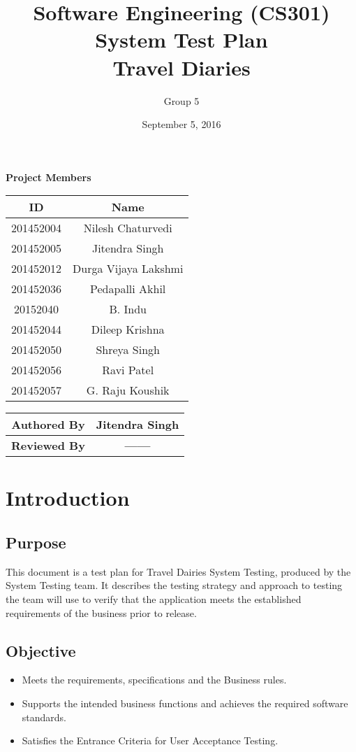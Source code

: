 \documentclass[]{article}
\title{Software Engineering (CS301)\\ System Test Plan\\Travel Diaries}
\author{Group 5}
\date{September 5, 2016}
\begin{document}
\maketitle


\begin{center}
\textbf{Project Members}\\
\vspace*{.6cm}
\begin{tabular}{|c|c|}
\hline
\textbf{ID} & \textbf{Name}\\
\hline
\hline
201452004 & Nilesh Chaturvedi\\
\hline
201452005 & Jitendra Singh\\
\hline
201452012 & Durga Vijaya Lakshmi\\
\hline
201452036 & Pedapalli Akhil\\
\hline
20152040 & B. Indu\\
\hline
201452044 & Dileep Krishna\\
\hline
201452050 & Shreya Singh\\
\hline
201452056 & Ravi Patel\\
\hline
201452057 & G. Raju Koushik\\
\hline
\end{tabular}

\vspace*{1cm}

\begin{tabular}{|c|c|}
\hline
\textbf{Authored By} & \textbf{Jitendra Singh}\\
\hline
\textbf{Reviewed By} & \textbf{------}\\
\hline
\end{tabular}
\end{center}

\newpage
\tableofcontents
\newpage


\section{Introduction}
\subsection{Purpose}
This document is a test plan for Travel Dairies  System Testing, produced by the System Testing team.  It describes the testing strategy and approach to testing the team will use to verify that the application meets the established requirements of the business prior to release.
\subsection{Objective}
\begin{itemize}
\item Meets the requirements, specifications and the Business rules.
\item Supports the intended business functions and achieves the required software standards.
\item Satisfies the Entrance Criteria for User Acceptance Testing.
\end{itemize}
\end{document}
